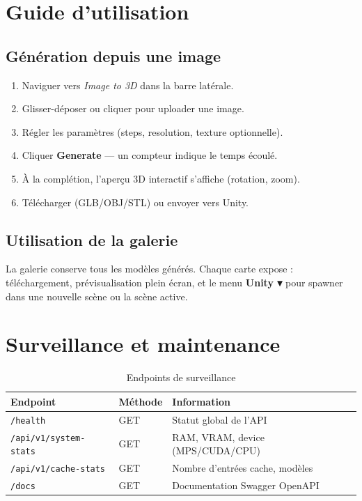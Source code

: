 \documentclass[12pt,a4paper,oneside]{report}
\begin{document}
\section{Guide d'utilisation}

\subsection{Génération depuis une image}
\begin{enumerate}[noitemsep]
  \item Naviguer vers \textit{Image to 3D} dans la barre latérale.
  \item Glisser-déposer ou cliquer pour uploader une image.
  \item Régler les paramètres (steps, resolution, texture optionnelle).
  \item Cliquer \textbf{Generate} — un compteur indique le temps écoulé.
  \item À la complétion, l'aperçu 3D interactif s'affiche (rotation, zoom).
  \item Télécharger (GLB/OBJ/STL) ou envoyer vers Unity.
\end{enumerate}

\subsection{Utilisation de la galerie}
La galerie conserve tous les modèles générés. Chaque carte expose :
téléchargement, prévisualisation plein écran, et le menu \textbf{Unity ▾}
pour spawner dans une nouvelle scène ou la scène active.

\section{Surveillance et maintenance}

\begin{table}[H]
\centering
\caption{Endpoints de surveillance}
\label{tab:monitoring}
\begin{tabularx}{\linewidth}{@{}llX@{}}
\toprule
\textbf{Endpoint} & \textbf{Méthode} & \textbf{Information} \\\midrule
\texttt{/health}              & GET & Statut global de l'API \\
\texttt{/api/v1/system-stats} & GET & RAM, VRAM, device (MPS/CUDA/CPU) \\
\texttt{/api/v1/cache-stats}  & GET & Nombre d'entrées cache, modèles \\
\texttt{/docs}                & GET & Documentation Swagger OpenAPI \\
\bottomrule
\end{tabularx}
\end{table}
\end{document}
